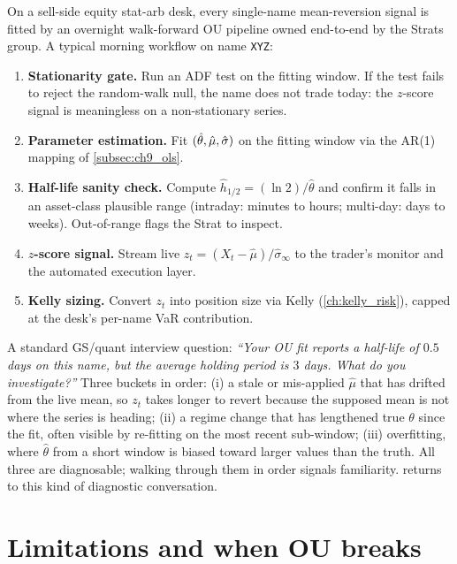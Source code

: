 \begin{gsbox}
On a sell-side equity stat-arb desk, every single-name
mean-reversion signal is fitted by an overnight walk-forward OU
pipeline owned end-to-end by the Strats group. A typical morning
workflow on name \texttt{XYZ}:
\begin{enumerate}
  \item \textbf{Stationarity gate.} Run an ADF test on the
  fitting window. If the test fails to reject the random-walk
  null, the name does not trade today: the $z$-score
  signal is meaningless on a non-stationary series.
  \item \textbf{Parameter estimation.} Fit
  $(\hat\theta, \hat\mu, \hat{\sigma})$ on the fitting window
  via the AR(1) mapping of \cref{subsec:ch9_ols}.
  \item \textbf{Half-life sanity check.} Compute
  $\hat h_{1/2} = (\ln 2)/\hat\theta$ and confirm it falls in
  an asset-class plausible range (intraday: minutes to hours;
  multi-day: days to weeks). Out-of-range flags the Strat to
  inspect.
  \item \textbf{$z$-score signal.} Stream live
  $z_t = (X_t - \hat\mu)/\hat\sigma_\infty$ to the trader's
  monitor and the automated execution layer.
  \item \textbf{Kelly sizing.} Convert $z_t$ into position size
  via Kelly (\cref{ch:kelly_risk}), capped at the desk's
  per-name VaR contribution.
\end{enumerate}
A standard GS/quant interview question:
\emph{``Your OU fit reports a half-life of $0.5$ days on this
name, but the average holding period is $3$ days. What do you
investigate?''} Three buckets in order: (i) a stale or
mis-applied $\hat\mu$ that has drifted from the live mean, so
$z_t$ takes longer to revert because the supposed mean is not
where the series is heading; (ii) a regime change that has
lengthened true $\theta$ since the fit, often visible by
re-fitting on the most recent sub-window; (iii) overfitting,
where $\hat\theta$ from a short window is biased toward larger
values than the truth. All three are diagnosable; walking
through them in order signals familiarity.
 returns to this kind of diagnostic
conversation.
\end{gsbox}

\section{Limitations and when OU breaks}
\label{sec:ch9_limits}

